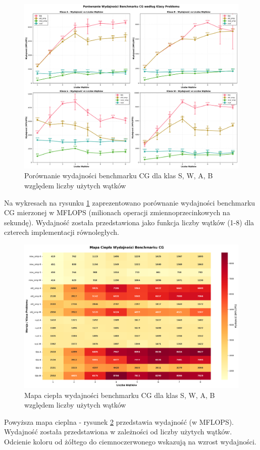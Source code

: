 \begin{figure}[H]
    \centering
    \includegraphics[width=\textwidth]{analiza/images/parallel/cg/cg_porownanie_wydajnosci.png}
    \caption{Porównanie wydajności benchmarku CG dla klas S, W, A, B względem liczby użytych wątków}
    \label{cg_porownanie_wydajnosci}
\end{figure}
Na wykresach na rysunku \ref{cg_porownanie_wydajnosci} zaprezentowano porównanie wydajności benchmarku CG mierzonej w MFLOPS (milionach operacji zmiennoprzecinkowych na sekundę). Wydajność została przedstawiona jako funkcja liczby wątków (1-8) dla czterech implementacji równoległych.

\begin{figure}[H]
    \centering
    \includegraphics[width=\textwidth]{analiza/images/parallel/cg/cg_mapa_ciepla_wydajnosci.png}
    \caption{Mapa ciepła wydajności benchmarku CG dla klas S, W, A, B względem liczby użytych wątków}
    \label{cg_heatmap_wydajnosci}
\end{figure}
Powyższa mapa cieplna - rysunek \ref{cg_heatmap_wydajnosci} przedstawia wydajność (w MFLOPS). Wydajność została przedstawiona w zależności od liczby użytych wątków. Odcienie koloru od żółtego do ciemnoczerwonego wskazują na wzrost wydajności.

